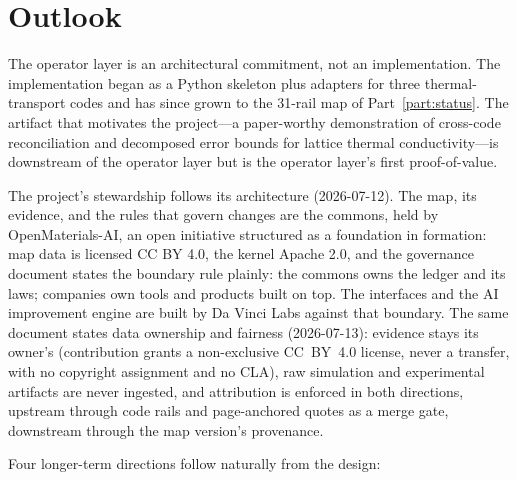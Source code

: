 \documentclass[11pt,a4paper]{article}
\begin{document}
\section{Outlook}
\label{sec:outlook}

The operator layer is an architectural commitment, not an implementation. The implementation
began as a Python skeleton plus adapters for three thermal-transport codes and has since grown
to the 31-rail map of Part~\ref{part:status}. The
artifact that motivates the project---a paper-worthy demonstration of cross-code reconciliation
and decomposed error bounds for lattice thermal conductivity---is downstream of the operator layer but
is the operator layer's first proof-of-value.

The project's stewardship follows its architecture (2026-07-12). The map, its
evidence, and the rules that govern changes are the commons, held by
OpenMaterials-AI, an open initiative structured as a foundation in formation:
map data is licensed CC BY 4.0, the kernel Apache 2.0, and the governance
document states the boundary rule plainly: the commons owns the ledger and its
laws; companies own tools and products built on top. The interfaces and the AI
improvement engine are built by Da Vinci Labs against that boundary. The same
document states data ownership and fairness (2026-07-13): evidence stays its
owner's (contribution grants a non-exclusive CC~BY~4.0 license, never a
transfer, with no copyright assignment and no CLA), raw simulation and
experimental artifacts are never ingested, and attribution is enforced in both
directions, upstream through code rails and page-anchored quotes as a merge
gate, downstream through the map version's provenance.

Four longer-term directions follow naturally from the design:
\end{document}
